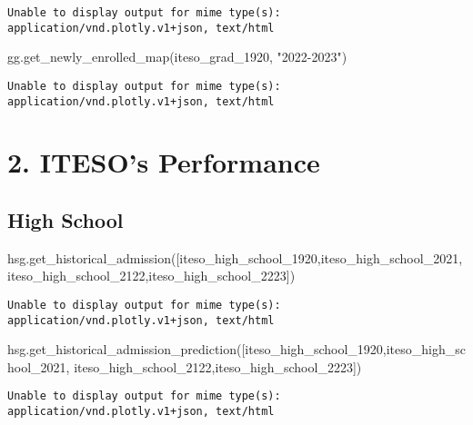 \documentclass[
  letterpaper,
  DIV=11,
  numbers=noendperiod]{scrartcl}
\newenvironment{Shaded}{\begin{snugshade}}{\end{snugshade}}
\newcommand{\NormalTok}[1]{\textcolor[rgb]{0.00,0.23,0.31}{#1}}
\newcommand{\StringTok}[1]{\textcolor[rgb]{0.13,0.47,0.30}{#1}}
\begin{document}
\begin{verbatim}
Unable to display output for mime type(s): application/vnd.plotly.v1+json, text/html
\end{verbatim}

\begin{Shaded}
\begin{Highlighting}[]
\NormalTok{gg.get\_newly\_enrolled\_map(iteso\_grad\_1920, }\StringTok{"2022{-}2023"}\NormalTok{)}
\end{Highlighting}
\end{Shaded}

\begin{verbatim}
Unable to display output for mime type(s): application/vnd.plotly.v1+json, text/html
\end{verbatim}

\section{2. ITESO's Performance}\label{itesos-performance}

\subsection{High School}\label{high-school-1}

\begin{Shaded}
\begin{Highlighting}[]
\NormalTok{hsg.get\_historical\_admission([iteso\_high\_school\_1920,iteso\_high\_school\_2021, }
\NormalTok{                        iteso\_high\_school\_2122,iteso\_high\_school\_2223])}
\end{Highlighting}
\end{Shaded}

\begin{verbatim}
Unable to display output for mime type(s): application/vnd.plotly.v1+json, text/html
\end{verbatim}

\begin{Shaded}
\begin{Highlighting}[]
\NormalTok{hsg.get\_historical\_admission\_prediction([iteso\_high\_school\_1920,iteso\_high\_school\_2021, }
\NormalTok{                        iteso\_high\_school\_2122,iteso\_high\_school\_2223])}
\end{Highlighting}
\end{Shaded}

\begin{verbatim}
Unable to display output for mime type(s): application/vnd.plotly.v1+json, text/html
\end{verbatim}
\end{document}
